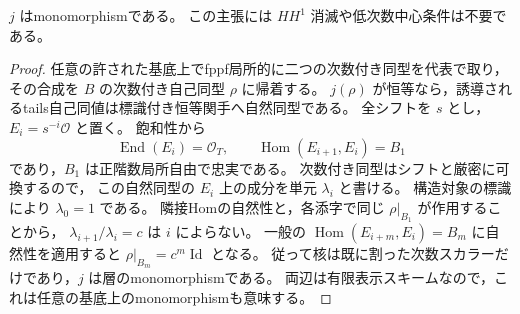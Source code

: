 \begin{lemma}[通常次数付き表示の忘却の核]
\label{lem:ordinary-graded-recognition-injective}
$j$ はmonomorphismである。
この主張には $HH^1$ 消滅や低次数中心条件は不要である。
\end{lemma}
\begin{proof}
任意の許された基底上でfppf局所的に二つの次数付き同型を代表で取り，
その合成を $B$ の次数付き自己同型 $\rho$ に帰着する。
$j(\rho)$ が恒等なら，誘導されるtails自己同値は標識付き恒等関手へ自然同型である。
全シフトを $s$ とし，$E_i=s^{-i}\mathcal O$ と置く。
飽和性から
\[
 \operatorname{End}(E_i)=\mathcal O_T,
 \qquad \operatorname{Hom}(E_{i+1},E_i)=B_1
\]
であり，$B_1$ は正階数局所自由で忠実である。
次数付き同型はシフトと厳密に可換するので，
この自然同型の $E_i$ 上の成分を単元 $\lambda_i$ と書ける。
構造対象の標識により $\lambda_0=1$ である。
隣接Homの自然性と，各添字で同じ $\rho|_{B_1}$ が作用することから，
$\lambda_{i+1}/\lambda_i=c$ は $i$ によらない。
一般の $\operatorname{Hom}(E_{i+m},E_i)=B_m$ に自然性を適用すると
$\rho|_{B_m}=c^m\operatorname{Id}$ となる。
従って核は既に割った次数スカラーだけであり，$j$ は層のmonomorphismである。
両辺は有限表示スキームなので，これは任意の基底上のmonomorphismも意味する。
\end{proof}

